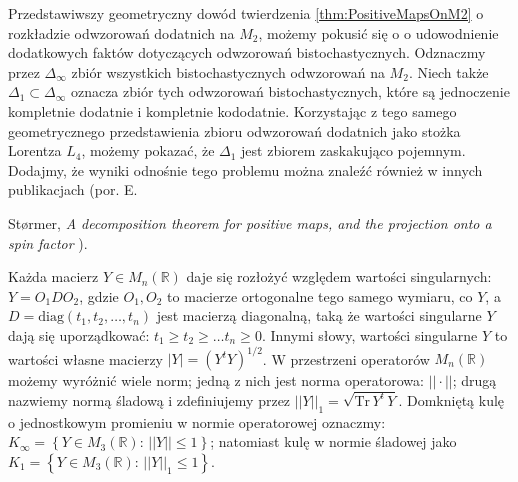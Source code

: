 Przedstawiwszy geometryczny dowód twierdzenia \ref{thm:PositiveMapsOnM2}
o rozkładzie odwzorowań dodatnich na $M_{2}$, możemy pokusić się o
o udowodnienie dodatkowych faktów dotyczących odwzorowań bistochastycznych.
Odznaczmy przez $\Delta_{\infty}$ zbiór wszystkich bistochastycznych odwzorowań na
$M_{2}$.
Niech także $\Delta_{1} \subset \Delta_{\infty}$ oznacza zbiór tych odwzorowań
bistochastycznych,
które są jednoczenie kompletnie dodatnie i kompletnie kododatnie.
Korzystając z tego samego geometrycznego przedstawienia zbioru
odwzorowań dodatnich jako stożka Lorentza $L_{4}$,
możemy pokazać, że $\Delta_{1}$ jest zbiorem zaskakująco pojemnym.
Dodajmy, że wyniki odnośnie tego problemu można znaleźć również w innych
publikacjach
(por. E.\,{St{\o}rmer, \emph{A decomposition theorem for positive maps, and the projection onto a spin factor}
\cite{stormer2013decomposition}).

Każda macierz $Y \in M_{n}(\mathbb{R})$ daje się rozłożyć względem wartości singularnych:
$Y = O_{1} D O_{2}$, gdzie
$O_{1}, O_{2}$ to macierze ortogonalne tego samego wymiaru, co $Y$, a
$D = \text{diag}(t_{1}, t_{2}, \ldots, t_{n})$ jest macierzą diagonalną,
taką że wartości singularne $Y$ dają się uporządkować:
$t_{1} \geq t_{2} \geq \ldots t_{n} \geq 0$.
Innymi słowy, wartości singularne $Y$ to wartości własne macierzy
$|Y| = (Y^{t} Y)^{1/2}$.
W przestrzeni operatorów $M_{n}(\mathbb{R})$ możemy wyróżnić wiele norm;
jedną z nich jest norma operatorowa: $|| \cdot ||$;
drugą nazwiemy normą śladową i zdefiniujemy przez
$||Y||_{1} = \sqrt{\text{Tr} \, Y^{t} \, Y }$.
Domkniętą kulę o jednostkowym promieniu w normie operatorowej oznaczmy:
$K_{\infty} = \left \{ Y \in M_{3}(\mathbb{R}): \, ||Y|| \leq 1 \right \}$;
natomiast kulę w normie śladowej jako
$K_{1} = \left \{ Y \in M_{3}(\mathbb{R}): \, ||Y||_{1} \leq 1 \right \}$.

}
